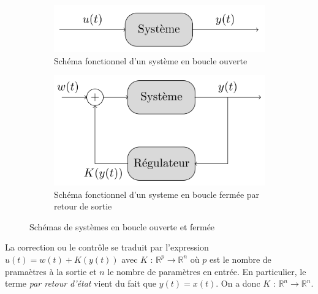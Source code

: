 \documentclass[a4paper]{article}
\begin{document}
                        \begin{figure}[h!]
                                \centering
                                \begin{subfigure}[b]{0.45\textwidth}
                                        \includegraphics[width=\textwidth]{images/schema_systeme_boucle_ouverte.png}
                                        \caption{Schéma fonctionnel d'un système en boucle ouverte}
                                        \label{fig_systeme_boucle_ouverte}
                                \end{subfigure}
                                \hspace{30pt}
                                \begin{subfigure}[b]{0.45\textwidth}
                                        \includegraphics[width=\textwidth]{images/schema_systeme_boucle_fermee.png}
                                        \caption{Schéma fonctionnel d'un systeme en boucle fermée par retour de sortie}
                                        \label{fig_systeme_boucle_fermee}
                                \end{subfigure}
                                \caption{Schémas de systèmes en boucle ouverte et fermée}
                                \label{fig_systeme_boucle}
                        \end{figure}


                        La correction ou le contrôle se traduit par l'expression $u(t) = w(t) + K(y(t))$ avec $K$ : $\mathbb{R}^p \to \mathbb{R}^n$
                        où $p$ est le nombre de pramaètres à la sortie et $n$ le nombre de paramètres en entrée.
                        En particulier, le terme \textit{par retour d'état} vient du fait que $y(t) = x(t)$. On a donc $K$ : $\mathbb{R}^n \to \mathbb{R}^n$.
\end{document}
